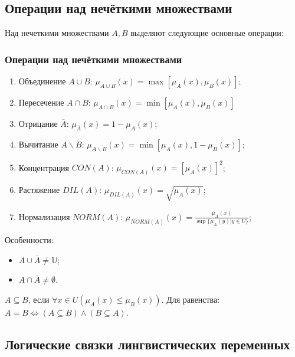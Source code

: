 \subsection{Операции над нечёткими множествами}

Над нечеткими множествами $A,B$ выделяют следующие основные операции:

\begin{frame}
    \frametitle{Операции над нечёткими множествами}
    
    \begin{enumerate}
        \item Объединение $A\cup B$: $\mu_{A\cup B}(x)=\max[\mu_A(x),\mu_B(x)]$;
        \item Пересечение $A\cap B$: $\mu_{A\cap B}(x)=\min[\mu_A(x),\mu_B(x)]$
        \item Отрицание $\overline{A}$: $\mu_{\overline{A}}(x)=1-\mu_A(x)$;
        \item Вычитание $A\backslash B$: $\mu_{A\backslash B}(x)=\min[\mu_A(x), 1-\mu_B(x)]$;
        \item Концентрация $CON(A)$: $\mu_{CON(A)}(x)=[\mu_A(x)]^2$;
        \item Растяжение $DIL(A)$: $\mu_{DIL(A)}(x)=\sqrt{\mu_A(x)}$;
        \item Нормализация $NORM(A)$: $\mu_{NORM(A)}(x)=\frac{\mu_A(x)}{\sup\{\mu_A(y)|y\in U\}}$;
    \end{enumerate}
    
    Особенности:
    \begin{itemize}
        \item $A\cup\overline{A}\neq \mathbb{U}$;
        \item $A\cap\overline{A}\neq\emptyset$.
    \end{itemize}
\end{frame}


$A\subseteq B$, если $\forall x\in U (\mu_A(x)\leq\mu_B(x))$. Для равенства: $A=B\Leftrightarrow (A\subseteq B)\land(B\subseteq A)$.


\subsection{Логические связки лингвистических переменных}

